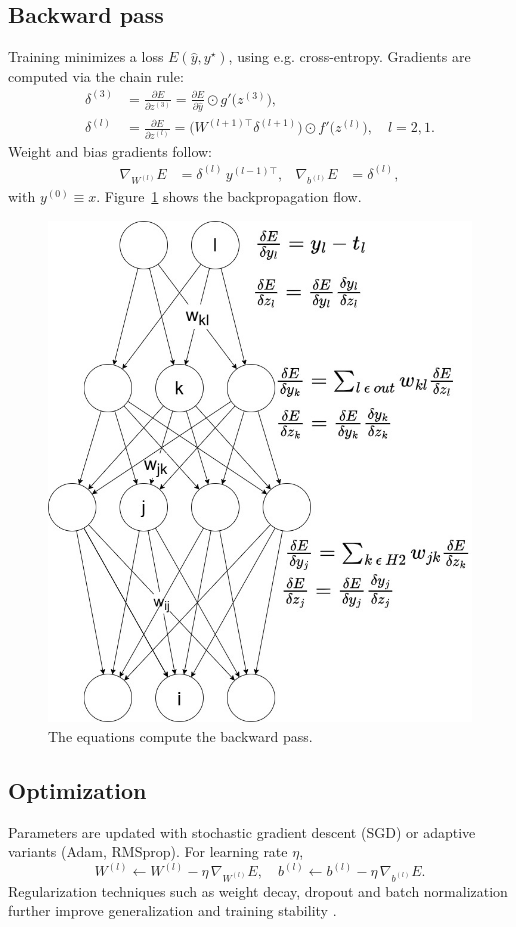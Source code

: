 \subsection{Backward pass}
Training minimizes a loss \(E(\hat y, y^\star)\), using e.g. cross-entropy. Gradients are computed via the chain rule:
\begin{align}
\delta^{(3)} &= \frac{\partial E}{\partial z^{(3)}}
= \frac{\partial E}{\partial \hat y}\odot g'\bigl(z^{(3)}\bigr),\\
\delta^{(l)} &= \frac{\partial E}{\partial z^{(l)}}
= \bigl(W^{(l+1)\top}\delta^{(l+1)}\bigr)\odot f'\bigl(z^{(l)}\bigr),
\quad l=2,1.
\end{align}
Weight and bias gradients follow:
\begin{align}
\nabla_{W^{(l)}}E &= \delta^{(l)}\,y^{(l-1)\top}, &
\nabla_{b^{(l)}}E &= \delta^{(l)},
\end{align}
with \(y^{(0)}\equiv x\). Figure~\ref{fig:backward_pass} shows the backpropagation flow.
\begin{figure}[ht]
    \centering
    \includegraphics[width=0.6\linewidth]{figures/neural_net_back_prop.jpg}
    \caption{The equations compute the backward pass.} 
    \label{fig:backward_pass}
\end{figure}

\subsection{Optimization}
Parameters are updated with stochastic gradient descent (SGD) or adaptive variants (Adam, RMSprop). For learning rate \(\eta\),
\[
W^{(l)} \leftarrow W^{(l)} - \eta\,\nabla_{W^{(l)}}E,
\quad
b^{(l)} \leftarrow b^{(l)} - \eta\,\nabla_{b^{(l)}}E.
\]
Regularization techniques such as weight decay, dropout and batch normalization further improve generalization and training stability \cite{ioffe_batch_2015}.

